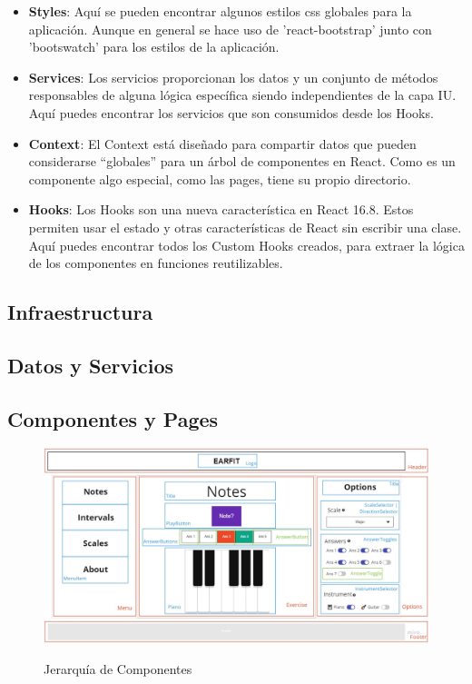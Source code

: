 \documentclass[12pt,twoside,titlepage]{report}
\begin{document}
\begin{itemize}
    \item \textbf{Styles}: Aquí se pueden encontrar algunos estilos css globales para la aplicación. Aunque en general se hace uso de 'react-bootstrap' junto con 'bootswatch' para los estilos de la aplicación.
    \item \textbf{Services}: Los servicios proporcionan los datos y un conjunto de métodos responsables de alguna lógica específica siendo independientes de la capa IU. Aquí puedes encontrar los servicios que son consumidos desde los Hooks.
    \item \textbf{Context}: El Context está diseñado para compartir datos que pueden considerarse “globales” para un árbol de componentes en React. Como es un componente algo especial, como las pages, tiene su propio directorio.
    \item \textbf{Hooks}: Los Hooks son una nueva característica en React 16.8. Estos permiten usar el estado y otras características de React sin escribir una clase. Aquí puedes encontrar todos los Custom Hooks creados, para extraer la lógica de los componentes en funciones reutilizables.
\end{itemize}

\subsection{Infraestructura}
\subsection{Datos y Servicios}
\subsection{Componentes y Pages}
\begin{figure}[H]
    \centering
    \includegraphics[scale=0.28]{Detalles de Implementación/JerarquíaComponentes}
    \label{fig:JerarquíaComponentes}
    \caption{Jerarquía de Componentes}
\end{figure}
\end{document}
